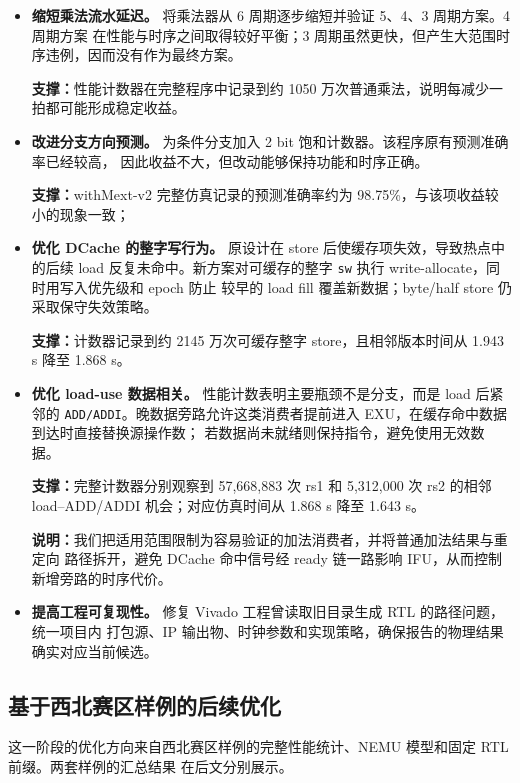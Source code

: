 \documentclass[UTF8,a4paper,12pt]{ctexart}
\newcommand{\code}[1]{\texttt{#1}}
\begin{document}
\begin{itemize}
  \item \textbf{缩短乘法流水延迟。} 将乘法器从 6 周期逐步缩短并验证 5、4、3 周期方案。4 周期方案
  在性能与时序之间取得较好平衡；3 周期虽然更快，但产生大范围时序违例，因而没有作为最终方案。
  \par\noindent\textbf{支撑：}{\kaishu 性能计数器在完整程序中记录到约 1050 万次普通乘法，说明每减少一拍都可能形成稳定收益。}
  \item \textbf{改进分支方向预测。} 为条件分支加入 2 bit 饱和计数器。该程序原有预测准确率已经较高，
  因此收益不大，但改动能够保持功能和时序正确。
  \par\noindent\textbf{支撑：}{\kaishu withMext-v2 完整仿真记录的预测准确率约为 98.75\%，与该项收益较小的现象一致；
  }
  \item \textbf{优化 DCache 的整字写行为。} 原设计在 store 后使缓存项失效，导致热点中的后续 load
  反复未命中。新方案对可缓存的整字 \code{sw} 执行 write-allocate，同时用写入优先级和 epoch 防止
  较早的 load fill 覆盖新数据；byte/half store 仍采取保守失效策略。
  \par\noindent\textbf{支撑：}{\kaishu 计数器记录到约 2145 万次可缓存整字 store，且相邻版本时间从
  1.943 s 降至 1.868 s。}
  \item \textbf{优化 load-use 数据相关。} 性能计数表明主要瓶颈不是分支，而是 load 后紧邻的
  \code{ADD/ADDI}。晚数据旁路允许这类消费者提前进入 EXU，在缓存命中数据到达时直接替换源操作数；
  若数据尚未就绪则保持指令，避免使用无效数据。
  \par\noindent\textbf{支撑：}{\kaishu 完整计数器分别观察到 57,668,883 次 rs1 和 5,312,000 次 rs2
  的相邻 load--ADD/ADDI 机会；对应仿真时间从 1.868 s 降至 1.643 s。}
  \par\noindent\textbf{说明：}我们把适用范围限制为容易验证的加法消费者，并将普通加法结果与重定向
  路径拆开，避免 DCache 命中信号经 ready 链一路影响 IFU，从而控制新增旁路的时序代价。
  \item \textbf{提高工程可复现性。} 修复 Vivado 工程曾读取旧目录生成 RTL 的路径问题，统一项目内
  打包源、IP 输出物、时钟参数和实现策略，确保报告的物理结果确实对应当前候选。
\end{itemize}

\subsection{基于西北赛区样例的后续优化}

这一阶段的优化方向来自西北赛区样例的完整性能统计、NEMU 模型和固定 RTL 前缀。两套样例的汇总结果
在后文分别展示。
\end{document}
